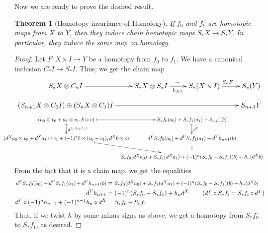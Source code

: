 \documentclass[12pt]{article}
\theoremstyle{plain}
\newtheorem{theorem}[equation]{Theorem}
\theoremstyle{definition}
\theoremstyle{remark}
\begin{document}
 Now we are ready to prove the desired result.
 \begin{theorem}[Homotopy invariance of Homology]
   If $f_0$ and $f_1$ are homotopic maps from $X$ to $Y$, then they induce chain
   homotopic maps $S_* X\to S_* Y$. In particular, they induce the same map on homology.
 \end{theorem}
 \begin{proof}
   Let $F:X\times I\to Y$ be a homotopy from $f_0$ to $f_1$. We have a canonical
   inclusion $C_*I\to S_*I$. Thus, we get the chain map
   \[\xymatrix @R-1pc{
    S_* X\otimes C_* I \ar[r] & S_* X\otimes S_* I\ar[r]^{\simeq}_{h_{XI}} & S_*(X\times
    I )\ar[r]^{S_*F} & S_*(Y)\\
    (S_{n+1}X\otimes C_0 I)\oplus (S_n X\otimes C_1) I \ar[rrr] & & & S_{n+1}Y
    }\]
   {\footnotesize \[\hspace*{-2pc}\xymatrix @!0 @R=3pc @C=20pc{
    (a_0\otimes v_0 + a_1\otimes v_1, b\otimes e)\ar@{|->}[r] \ar@{|->}[d]^{d^{S_*X\otimes C_*I}} &
    S_*f_0(a_0)+S_*f_1(a_1)+h_{n+1}(b) \ar@{|->}[d]^<>(.5){d^Y}\\
    (d^Xa_0\otimes v_0 + d^X a_1\otimes v_1 + (-1)^n b\otimes
    (v_0-v_1), d^Xb\otimes e) \ar@{|->}[rd] & d^Y S_*f_0(a_0)+d^Y S_*f_1(a_1) + d^Yh_{n+1}(b) \ar@{}[d]|{\parallel}\\
    & S_*f_0(d^X a_0) + S_*f_1(d^Xa_1) + (-1)^n(S_*f_0-S_*f_1)(b) + h_n(d^Xb)
   }\]}
   From the fact that it is a chain map, we get the equalities
   \begin{align*}
    \mbox{\footnotesize $d^Y S_*f_0(a_0)+d^Y S_*f_1(a_1) + d^Yh_{n+1}(b)$} &=
    \mbox{\footnotesize $S_*f_0(d^X a_0) + S_*f_1(d^Xa_1) + (-1)^n(S_*f_0-S_*f_1)(b) + h_n(d^Xb)$}\\
    d^Y h_{n+1} &= (-1)^n(S_*f_0-S_*f_1) + h_nd^X & \llap{($d^Y\circ S_*f_i= S_*f_i\circ d^Y$)}\\
    d^Y \circ (-1)^n h_{n+1} + (-1)^{n-1} h_n \circ d^X &= S_*f_0-S_*f_1
   \end{align*}
   Thus, if we twist $h$ by some minus signs as above, we get a homotopy from $S_*f_0$ to
   $S_*f_1$, as desired.
 \end{proof}
\end{document}
